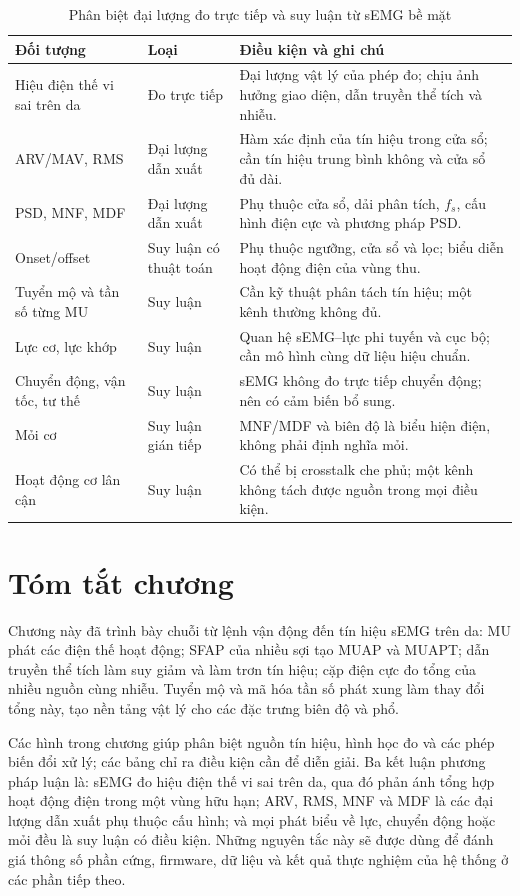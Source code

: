 \begin{table}[htbp]
\centering
\caption{Phân biệt đại lượng đo trực tiếp và suy luận từ sEMG bề mặt}
\label{tab:direct-vs-inference}
\begin{tabularx}{\textwidth}{@{}P{4.0cm}P{2.6cm}Y@{}}
\toprule
\textbf{Đối tượng} & \textbf{Loại} & \textbf{Điều kiện và ghi chú} \\
\midrule
Hiệu điện thế vi sai trên da & Đo trực tiếp & Đại lượng vật lý của phép đo; chịu ảnh hưởng giao diện, dẫn truyền thể tích và nhiễu. \\
ARV/MAV, RMS & Đại lượng dẫn xuất & Hàm xác định của tín hiệu trong cửa sổ; cần tín hiệu trung bình không và cửa sổ đủ dài. \\
PSD, MNF, MDF & Đại lượng dẫn xuất & Phụ thuộc cửa sổ, dải phân tích, $f_s$, cấu hình điện cực và phương pháp PSD. \\
Onset/offset & Suy luận có thuật toán & Phụ thuộc ngưỡng, cửa sổ và lọc; biểu diễn hoạt động điện của vùng thu. \\
Tuyển mộ và tần số từng MU & Suy luận & Cần kỹ thuật phân tách tín hiệu; một kênh thường không đủ. \\
Lực cơ, lực khớp & Suy luận & Quan hệ sEMG--lực phi tuyến và cục bộ; cần mô hình cùng dữ liệu hiệu chuẩn. \\
Chuyển động, vận tốc, tư thế & Suy luận & sEMG không đo trực tiếp chuyển động; nên có cảm biến bổ sung. \\
Mỏi cơ & Suy luận gián tiếp & MNF/MDF và biên độ là biểu hiện điện, không phải định nghĩa mỏi. \\
Hoạt động cơ lân cận & Suy luận & Có thể bị crosstalk che phủ; một kênh không tách được nguồn trong mọi điều kiện. \\
\bottomrule
\end{tabularx}
\end{table}

\section{Tóm tắt chương}
\label{sec:ch2-summary}

Chương này đã trình bày chuỗi từ lệnh vận động đến tín hiệu sEMG trên da:
MU phát các điện thế hoạt động; SFAP của nhiều sợi tạo MUAP và MUAPT; dẫn
truyền thể tích làm suy giảm và làm trơn tín hiệu; cặp điện cực đo tổng
của nhiều nguồn cùng nhiễu. Tuyển mộ và mã hóa tần số phát xung làm thay đổi tổng
này, tạo nền tảng vật lý cho các đặc trưng biên độ và phổ.

Các hình trong chương giúp phân biệt nguồn tín hiệu, hình học đo và các
phép biến đổi xử lý; các bảng chỉ ra điều kiện cần để diễn giải. Ba kết
luận phương pháp luận là: sEMG đo hiệu điện thế vi sai trên da, qua đó
phản ánh tổng hợp hoạt động điện trong một vùng hữu hạn; ARV, RMS, MNF và
MDF là các đại lượng dẫn xuất phụ thuộc cấu hình; và mọi phát
biểu về lực, chuyển động hoặc mỏi đều là suy luận có điều kiện. Những
nguyên tắc này sẽ được dùng để đánh giá thông số phần cứng, firmware, dữ
liệu và kết quả thực nghiệm của hệ thống ở các phần tiếp theo.
